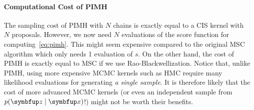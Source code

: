 \paragraph{Computational Cost of PIMH}
The sampling cost of PIMH with \(N\) chains is exactly equal to a CIS kernel with \(N\) proposals.
However, we now need \(N\) evaluations of the score function for computing~\eqref{eq:pimh}.
This might seem expensive compared to the original MSC algorithm which only needs 1 evaluation of \(s\).
On the other hand, the cost of PIMH is exactly equal to MSC if we use Rao-Blackwellization.
Notice that, unlike PIMH, using more expensive MCMC kernels such as HMC require many likelihood evaluations for generating \textit{a single sample}.
It is therefore likely that the cost of more advanced MCMC kernels (or even an independent sample from \(p(\vz\mid\vx)\)!) might not be worth their benefits.


